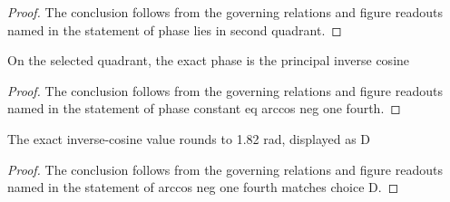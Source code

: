 \begin{proof}
  The conclusion follows from the governing relations and figure readouts named in the statement of phase lies in second quadrant.
\end{proof}
\begin{lemma}
  \label{lem:physics:phyx-mini-0277:phyxminiproblems-problemphyxmini0277-phase-constant-eq-arccos-neg-one-fourth}
  On the selected quadrant, the exact phase is the principal inverse cosine
\end{lemma}
\begin{proof}
  The conclusion follows from the governing relations and figure readouts named in the statement of phase constant eq arccos neg one fourth.
\end{proof}
\begin{lemma}
  \label{lem:physics:phyx-mini-0277:phyxminiproblems-problemphyxmini0277-arccos-neg-one-fourth-matches-choice-d}
  The exact inverse-cosine value rounds to 1.82 rad, displayed as D
\end{lemma}
\begin{proof}
  The conclusion follows from the governing relations and figure readouts named in the statement of arccos neg one fourth matches choice D.
\end{proof}
